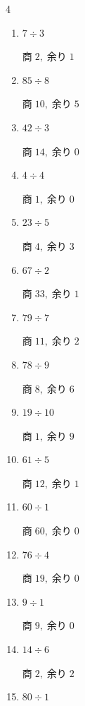 \begin{multicols}{4}
\begin{enumerate}
        $商\; 33,\; 余り\; 0$

  \item $7 \div 3$

        $商\; 2,\; 余り\; 1$

  \item $85 \div 8$

        $商\; 10,\; 余り\; 5$

  \item $42 \div 3$

        $商\; 14,\; 余り\; 0$

  \item $4 \div 4$

        $商\; 1,\; 余り\; 0$

  \item $23 \div 5$

        $商\; 4,\; 余り\; 3$

  \item $67 \div 2$

        $商\; 33,\; 余り\; 1$

  \item $79 \div 7$

        $商\; 11,\; 余り\; 2$

  \item $78 \div 9$

        $商\; 8,\; 余り\; 6$

  \item $19 \div 10$

        $商\; 1,\; 余り\; 9$

\columnbreak %

  \item $61 \div 5$

        $商\; 12,\; 余り\; 1$

  \item $60 \div 1$

        $商\; 60,\; 余り\; 0$

  \item $76 \div 4$

        $商\; 19,\; 余り\; 0$

  \item $9 \div 1$

        $商\; 9,\; 余り\; 0$

  \item $14 \div 6$

        $商\; 2,\; 余り\; 2$

  \item $80 \div 1$


\end{enumerate}
\end{multicols}
